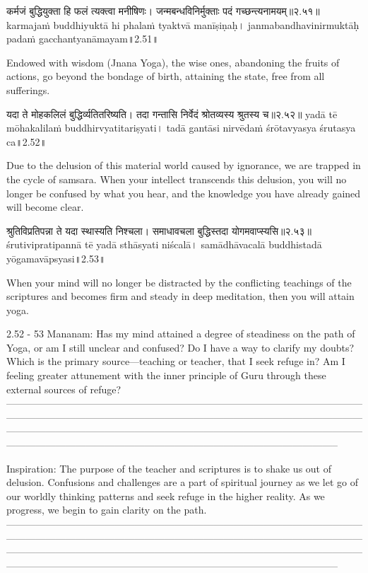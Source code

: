 कर्मजं बुद्धियुक्ता हि फलं त्यक्त्वा मनीषिणः।
 जन्मबन्धविनिर्मुक्ताः पदं गच्छन्त्यनामयम्॥२.५१॥
karmajaṁ buddhiyuktā hi phalaṁ tyaktvā manīṣiṇaḥ।
janmabandhavinirmuktāḥ padaṁ gacchantyanāmayam॥2.51॥

Endowed with wisdom (Jnana Yoga), the wise ones, abandoning the fruits of actions, go beyond the bondage of birth, attaining the state, free from all sufferings. 


यदा ते मोहकलिलं बुद्धिर्व्यतितरिष्यति। 
तदा गन्तासि निर्वेदं श्रोतव्यस्य श्रुतस्य च॥२.५२॥
yadā tē mōhakalilaṁ buddhirvyatitariṣyati। 
tadā gantāsi nirvēdaṁ śrōtavyasya śrutasya ca॥2.52॥

Due to the delusion of this material world caused by ignorance, we are trapped in the cycle of  samsara. When your intellect transcends this delusion, you will no longer be confused by what you hear, and the knowledge you have already gained will become clear. 


श्रुतिविप्रतिपन्ना ते यदा स्थास्यति निश्चला। 
समाधावचला बुद्धिस्तदा योगमवाप्स्यसि॥२.५३॥
śrutivipratipannā tē yadā sthāsyati niścalā। 
samādhāvacalā buddhistadā yōgamavāpsyasi॥2.53॥

When your mind will no longer be distracted by the conflicting teachings of the scriptures and becomes firm and steady in deep meditation, then you will attain yoga. 

2.52 - 53 Mananam:
Has my mind attained a degree of steadiness on the path of Yoga, or am I still unclear and confused? Do I have a way to clarify my doubts? Which is the primary source—teaching or teacher, that I seek refuge in? Am I feeling greater attunement with the inner principle of Guru through these external sources of refuge?
—--------------------------------------------------------------------------------------------------------------------------------------------------------------------------------------------------------------------------------------------------------------------------------------------------------------------------------------------------------------------------------------------------------------------------------------
 
Inspiration:
The purpose of the teacher and scriptures is to shake us out of delusion. Confusions and challenges are a part of spiritual journey as we let go of our worldly thinking patterns and seek refuge in the higher reality. As we progress, we begin to gain clarity on the path.
—--------------------------------------------------------------------------------------------------------------------------------------------------------------------------------------------------------------------------------------------------------------------------------------------------------------------------------------------------------------------------------------------------------------------------------------

